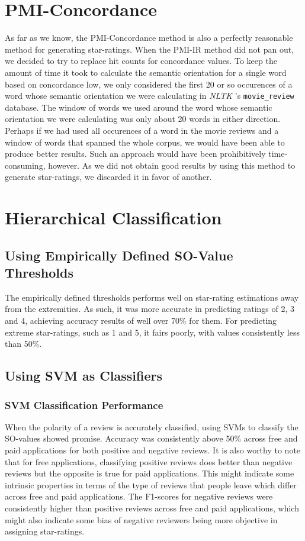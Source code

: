 \documentclass[11pt]{report} %
\begin{document}
	\section{PMI-Concordance}

As far as we know, the PMI-Concordance method is also a perfectly reasonable method for generating star-ratings. When the PMI-IR method did not pan out, we decided to try to replace hit counts for concordance values. To keep the amount of time it took to calculate the semantic orientation for a single word based on concordance low, we only considered the first 20 or so occurences of a word whose semantic orientation we were calculating in \textit{NLTK} 's \verb|movie_review| database. The window of words we used around the word whose semantic orientation we were calculating was only about 20 words in either direction. Perhaps if we had used all occurences of a word in the movie reviews and a window of words that spanned the whole corpus, we would have been able to produce better results. Such an approach would have been prohibitively time-consuming, however. As we did not obtain good results by using this method to generate star-ratings, we discarded it in favor of another. 


	\section{Hierarchical Classification}
	\subsection{Using Empirically Defined SO-Value Thresholds}
The empirically defined thresholds performs well on star-rating estimations away from the extremities. As such, it was more accurate in predicting ratings of 2, 3 and 4, achieving accuracy results of well over 70\% for them. For predicting extreme star-ratings, such as 1 and 5, it fairs poorly, with values consistently less than 50\%.

	\subsection{Using SVM as Classifiers} 
\subsubsection{SVM Classification Performance}
When the polarity of a review is accurately classified, using SVMs to classify the SO-values showed promise. Accuracy was consistently above 50\% across free and paid applications for both positive and negative reviews. It is also worthy to note that for free applications, classifying positive reviews does better than negative reviews but the opposite is true for paid applications. This might indicate some intrinsic properties in terms of the type of reviews that people leave which differ across free and paid applications. The F1-scores for negative reviews were consistently higher than positive reviews across free and paid applications, which might also indicate some bias of negative reviewers being more objective in assigning star-ratings.
\end{document}
